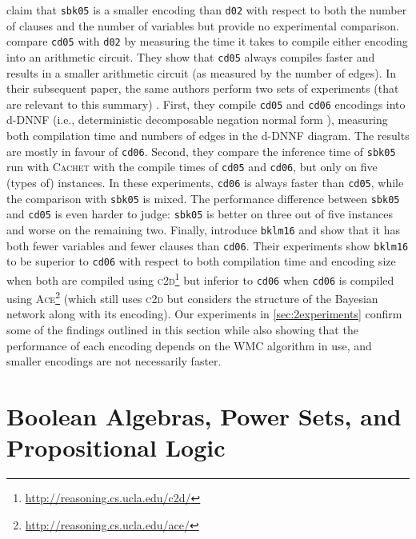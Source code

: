 \citet{DBLP:conf/aaai/SangBK05} claim that
\texttt{sbk05} is a smaller encoding than \texttt{d02} with respect to both the
number of clauses and the number of variables but provide no experimental
comparison. \citet{DBLP:conf/ijcai/ChaviraD05} compare \texttt{cd05} with
\texttt{d02} by measuring the time it takes to compile either encoding into an
arithmetic circuit. They show that
\texttt{cd05} always compiles faster and results in a smaller arithmetic circuit
(as measured by the number of edges). In their subsequent paper, the same
authors perform two sets of experiments (that are relevant to this summary)
\citep{DBLP:conf/sat/ChaviraD06}. First, they compile \texttt{cd05} and
\texttt{cd06} encodings into d-DNNF (i.e., deterministic decomposable negation
normal form \citep{DBLP:journals/jancl/Darwiche01}), measuring both compilation
time and numbers of edges in the d-DNNF diagram. The results are mostly in
favour of \texttt{cd06}. Second, they compare the inference time of
\texttt{sbk05} run with \textsc{Cachet} \citep{DBLP:conf/sat/SangBBKP04} with
the compile times of \texttt{cd05} and \texttt{cd06}, but only on five (types
of) instances. In these experiments, \texttt{cd06} is always faster than
\texttt{cd05}, while the comparison with \texttt{sbk05} is mixed.  The
performance difference between \texttt{sbk05} and \texttt{cd05} is even harder
to judge: \texttt{sbk05} is better on three out of five instances and worse on
the remaining two. Finally, \citet{DBLP:conf/ecai/BartKLM16} introduce
\texttt{bklm16} and show that it has both fewer variables and fewer clauses than
\texttt{cd06}. Their experiments show \texttt{bklm16} to be superior to
\texttt{cd06} with respect to both compilation time and encoding size when both
are compiled using
\textsc{c2d}\footnote{\url{http://reasoning.cs.ucla.edu/c2d/}}
\citep{DBLP:conf/ecai/Darwiche04} but inferior to \texttt{cd06} when
\texttt{cd06} is compiled using
\textsc{Ace}\footnote{\url{http://reasoning.cs.ucla.edu/ace/}} (which still uses
\textsc{c2d} but considers the structure of the Bayesian network along with its
encoding). Our experiments in \cref{sec:2experiments} confirm some of the
findings outlined in this section while also showing that the performance of
each encoding depends on the WMC algorithm in use, and smaller encodings are not
necessarily faster.

\section{Boolean Algebras, Power Sets, and Propositional
  Logic}\label{sec:prelims}

